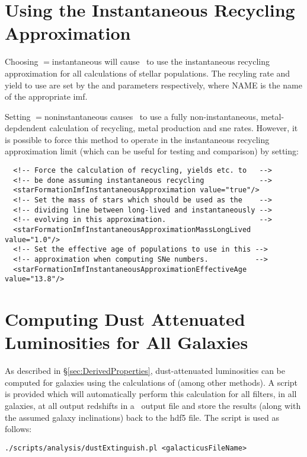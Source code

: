 \section{Using the Instantaneous Recycling Approximation}

Choosing {\normalfont \ttfamily [stellarPopulationPropertiesMethod]}$=${\normalfont \ttfamily instantaneous} will cause \glc\ to use the instantaneous recycling approximation for all calculations of stellar populations. The recyling rate and yield to use are set by the {\normalfont \ttfamily [imfNAMERecycledInstantaneous]} and {\normalfont \ttfamily [imfNAMEYieldInstantaneous]} parameters respectively, where {\normalfont \ttfamily NAME} is the name of the appropriate \gls{imf}.

Setting {\normalfont \ttfamily [stellarPopulationPropertiesMethod]}$=${\normalfont \ttfamily noninstantaneous} causes \glc\ to use a fully non-instantaneous, metal-depdendent calculation of recycling, metal production and \gls{sne} rates. However, it is possible to force this method to operate in the instantaneous recycling approximation limit (which can be useful for testing and comparison) by setting:
\begin{verbatim}
  <!-- Force the calculation of recycling, yields etc. to   -->
  <!-- be done assuming instantaneous recycling             -->
  <starFormationImfInstantaneousApproximation value="true"/>
  <!-- Set the mass of stars which should be used as the    -->
  <!-- dividing line between long-lived and instantaneously -->
  <!-- evolving in this approximation.                      -->
  <starFormationImfInstantaneousApproximationMassLongLived value="1.0"/>
  <!-- Set the effective age of populations to use in this -->
  <!-- approximation when computing SNe numbers.           -->
  <starFormationImfInstantaneousApproximationEffectiveAge value="13.8"/>
\end{verbatim}

\section{Computing Dust Attenuated Luminosities for All Galaxies}\label{sec:TutorialDustAttenuation}

As described in \S\ref{sec:DerivedProperties}, dust-attenuated luminosities can be computed for galaxies using the calculations of \cite{ferrara_atlas_1999} (among other methods). A script is provided which will automatically perform this calculation for all filters, in all galaxies, at all output redshifts in a \glc\ output file and store the results (along with the assumed galaxy inclinations) back to the \gls{hdf5} file. The script is used as follows:
\begin{verbatim}
./scripts/analysis/dustExtinguish.pl <galacticusFileName>
\end{verbatim}

